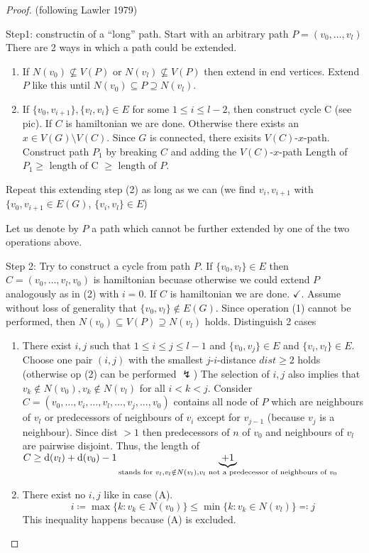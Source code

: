 \documentclass[aagt.tex]{subfiles}
\begin{document}
\begin{proof}
  (following Lawler 1979)
  
  Step1: constructin of a \enquote{long} path.
  Start with an arbitrary path $P = (v_0,\dots,v_l)$
  There are 2 ways in which a path could be extended.
  \begin{enumerate}
    \item If $N(v_0) \nsubseteq V(P)$ or $N(v_l) \nsubseteq V(P)$ then extend in end vertices.
    Extend $P$ like this until $N(v_0) \subseteq P \supseteq N(v_l)$.
    \item {}
    If $\{v_0,v_{i+1}\}, \{v_l,v_i\} \in E$ for some $1 \leq i \leq l-2$, then construct cycle C (see pic).
    If $C$ is hamiltonian we are done. Otherwise there exists an $x \in V(G) \setminus V(C)$.
    Since $G$ is connected, there exisits $V(C)$-$x$-path.
    Construct path $P_1$ by breaking $C$ and adding the $V(C)$-$x$-path
    Length of $P_1 \geq \text{ length of C } \geq \text{ length of } P$.
  \end{enumerate}
  Repeat this extending step (2) as long as we can (we find $v_i,v_{i+1}$ with $\{v_0,v_{i+1} \in E(G)$, $\{v_i,v_l\} \in E$)
  
  Let us denote by $P$ a path which cannot be further extended by one of the two operations above.
  
  Step 2: Try to construct a cycle from path $P$.
  If $\{v_0,v_l\} \in E$ then $C = (v_0,\dots,v_l,v_0)$ is hamiltonian becuase otherwise we could extend $P$ analogously as in (2) with $i = 0$.
  If $C$ is hamiltonian we are done. $\checkmark$.
  Assume without loss of generality that $\{v_0,v_l\} \notin E(G)$.
  Since operation (1) cannot be performed, then $N(v_0) \subseteq V(P) \supseteq N(v_l)$ holds.
  Distinguish 2 cases
  \begin{enumerate}[label=(\Alph*)]
    \item There exist $i,j$ such that $1 \leq i \leq j \leq l-1$ and $\{v_0,v_j\}\in E$ and $\{v_i,v_l\} \in E$.
    Choose one pair $(i,j)$ with the smallest $j$-$i$-distance $dist \geq 2$ holds (otherwise op (2) can be performed $\lightning$)
    The selection of $i,j$ also implies that $v_k \notin N(v_0), v_k \notin N(v_l)$ for all $i < k < j$.
    Consider $C = (v_0,\dots,v_i,\dots,v_l,\dots,v_j,\dots,v_0)$ contains all node of $P$ which are neighbours of $v_l$ or predecessors of neighbours of $v_i$ except for $v_{j-1}$ (because $v_j$ is a neighbour).
    Since dist $> 1$ then predecessors of $n$ of $v_0$ and neighbours of $v_l$ are pairwise disjoint.
    Thus, the length of $C \geq \operatorname{d}(v_l) + \operatorname{d}(v_0) - 1 \underbrace{+ 1}_{\text{stands for } v_l, v_l \notin N(v_l), v_l \text{ not a predecessor of neighbours of } v_0}$
    \item There exist no $i,j$ like in case (A).
    \[ i \coloneqq \max\{k: v_k \in N(v_0) \} \leq \min\{k: v_k \in N(v_l)\} \eqqcolon j \]
    This inequality happens because (A) is excluded.
    

\end{enumerate}
\end{proof}
\end{document}

